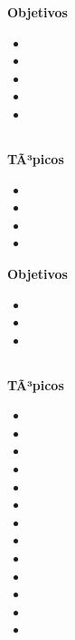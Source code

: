 \textbf{Objetivos}
\begin{itemize}
	\item \ALCINCOObjUNO
	\item \ALCINCOObjDOS
	\item \ALCINCOObjTRES
	\item \ALCINCOObjCUATRO
	\item \ALCINCOObjCINCO
\end{itemize}

\subsection{\ALSEISDef }\label{sec:BOK-AL6}

\textbf{TÃ³picos}
\begin{itemize}
	\item \ALSEISTopicDefinicion
	\item \ALSEISTopicNP
	\item \ALSEISTopicProblemas
	\item \ALSEISTopicTecnicas
\end{itemize}

\textbf{Objetivos}
\begin{itemize}
	\item \ALSEISObjUNO
	\item \ALSEISObjDOS
	\item \ALSEISObjTRES
\end{itemize}

\subsection{\ALSIETEDef }\label{sec:BOK-AL7}

\textbf{TÃ³picos}
\begin{itemize}
	\item \ALSIETETopicAutomatas
	\item \ALSIETETopicAutomatasfinitos
	\item \ALSIETETopicEquivalencias
	\item \ALSIETETopicExpresiones
	\item \ALSIETETopicEl
	\item \ALSIETETopicAutomatasde
	\item \ALSIETETopicRelacion
	\item \ALSIETETopicPropiedades
	\item \ALSIETETopicMaquinas
	\item \ALSIETETopicMaquinasde
	\item \ALSIETETopicConjuntos
	\item \ALSIETETopicLa
	\item \ALSIETETopicLatesis
\end{itemize}

